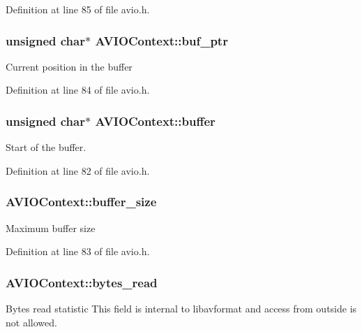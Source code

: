 Definition at line 85 of file avio.\+h.

\subsubsection[{\texorpdfstring{buf\+\_\+ptr}{buf_ptr}}]{\setlength{\rightskip}{0pt plus 5cm}unsigned char$\ast$ A\+V\+I\+O\+Context\+::buf\+\_\+ptr}\hypertarget{struct_a_v_i_o_context_a3500915a7434270c42dffc80fafffa2d}{}\label{struct_a_v_i_o_context_a3500915a7434270c42dffc80fafffa2d}
Current position in the buffer 

Definition at line 84 of file avio.\+h.

\subsubsection[{\texorpdfstring{buffer}{buffer}}]{\setlength{\rightskip}{0pt plus 5cm}unsigned char$\ast$ A\+V\+I\+O\+Context\+::buffer}\hypertarget{struct_a_v_i_o_context_a901e8fd2b978d40957c4ed0b77c2daf0}{}\label{struct_a_v_i_o_context_a901e8fd2b978d40957c4ed0b77c2daf0}
Start of the buffer. 

Definition at line 82 of file avio.\+h.

\subsubsection[{\texorpdfstring{buffer\+\_\+size}{buffer_size}}]{ A\+V\+I\+O\+Context\+::buffer\+\_\+size}\hypertarget{struct_a_v_i_o_context_a0204148f407d72becba822b90e8ce9a6}{}\label{struct_a_v_i_o_context_a0204148f407d72becba822b90e8ce9a6}
Maximum buffer size 

Definition at line 83 of file avio.\+h.

\subsubsection[{\texorpdfstring{bytes\+\_\+read}{bytes_read}}]{ A\+V\+I\+O\+Context\+::bytes\+\_\+read}\hypertarget{struct_a_v_i_o_context_a2685da68190c842c028ec161ff2b563e}{}\label{struct_a_v_i_o_context_a2685da68190c842c028ec161ff2b563e}
Bytes read statistic This field is internal to libavformat and access from outside is not allowed. 

